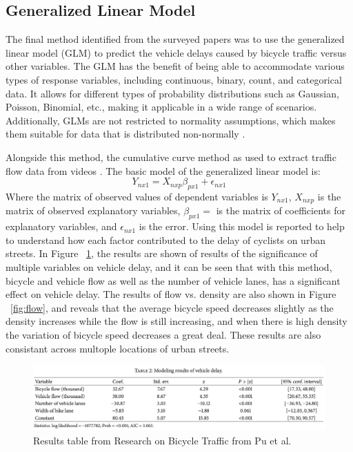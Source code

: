 \documentclass[12pt, letterpaper]{article}
\begin{document}
\subsection{Generalized Linear Model}
\label{sec:gen}

The final method identified from the surveyed papers was to use the generalized linear model (GLM) to predict the vehicle delays caused by bicycle traffic versus other variables. The GLM has the benefit of being able to accommodate various types of response variables, including continuous, binary, count, and categorical data. It allows for different types of probability distributions such as Gaussian, Poisson, Binomial, etc., making it applicable in a wide range of scenarios. Additionally, GLMs are not restricted to normality assumptions, which makes them suitable for data that is distributed non-normally \cite{PennState2023}.

Alongside this method, the cumulative curve method as used to extract traffic flow data from videos \cite{6Pu2017}. The basic model of the generalized linear model is:
\[Y_{nx1} = X_{nxp}\beta_{px1}+\epsilon_{nx1}\]
Where the matrix of observed values of dependent variables is  $Y_{nx1}$, $X_{nxp}$ is the matrix of observed explanatory variables, $\beta_{px1} =$ is the matrix of coefficients for explanatory variables, and $\epsilon_{nx1}$ is the error. Using this model is reported to help to understand how each factor contributed to the delay of cyclists on urban streets. In Figure ~\ref{fig:traffic}, the results are shown of results of the significance of multiple variables on vehicle delay, and it can be seen that with this method, bicycle and vehicle flow as well as the number of vehicle lanes, has a significant effect on vehicle delay. The results of flow vs. density are also shown in Figure ~\ref{fig:flow}, and reveals that the average bicycle speed decreases slightly as the density increases while  the flow is still increasing, and  when there is high density the variation of bicycle speed decreases a great deal. These results are also consistant across multople locations of urban streets. 
\begin{figure}[hbt!]
    \centering \includegraphics[width=1\textwidth]{BikeTrafficResults.png}
    \caption{Results table from Research on Bicycle Traffic from Pu et al.}
    \label{fig:traffic}
\end{figure}
\end{document}

